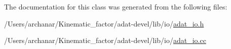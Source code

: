 The documentation for this class was generated from the following files\+:\begin{DoxyCompactItemize}
\item 
/\+Users/archanar/\+Kinematic\+\_\+factor/adat-\/devel/lib/io/\mbox{\hyperlink{adat-devel_2lib_2io_2adat__io_8h}{adat\+\_\+io.\+h}}\item 
/\+Users/archanar/\+Kinematic\+\_\+factor/adat-\/devel/lib/io/\mbox{\hyperlink{adat-devel_2lib_2io_2adat__io_8cc}{adat\+\_\+io.\+cc}}\end{DoxyCompactItemize}
